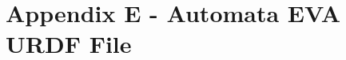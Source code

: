 \newpage
\section{Appendix E - Automata EVA URDF File}
\inputminted[fontsize=\footnotesize,baselinestretch=1, linenos]{xml}{appendices/automataEVA.urdf}